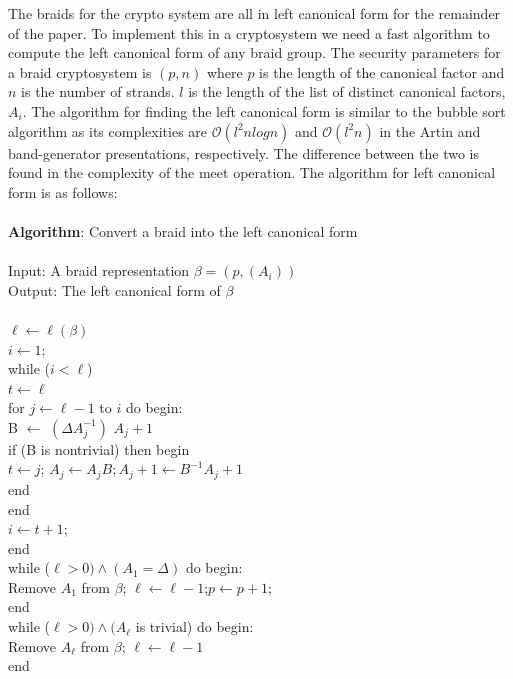 \documentclass{article}
\theoremstyle{definition}
\begin{document}
	The braids for the crypto system are all in left canonical form for the remainder of the paper. To implement this in a cryptosystem we need a fast algorithm to compute the left canonical form of any braid group. The security parameters for a braid cryptosystem is $(p,n)$ where $p$ is the length of the canonical factor and $n$ is the number of strands. $l$ is the length of the list of distinct canonical factors, $A_i$. The algorithm for finding the left canonical form is similar to the bubble sort algorithm as its complexities are $\mathcal{O}(l^2 n log{}n)$ and $\mathcal{O}(l^2 n)$ in the Artin and band-generator presentations, respectively. The difference between the two is found in the complexity of the meet operation. The algorithm for left canonical form is as follows:
	\\
	\\  \textbf{Algorithm}: Convert a braid into the left canonical form
	\\
	\\ \indent Input: A braid representation $\beta = (p, (A_i))$
	\\ \indent Output: The left canonical form of $\beta$
	\\
	\\ \indent $\ell \leftarrow \ell(\beta)$
	\\ \indent $i \leftarrow 1$;
	\\ \indent while ($i < \ell$)
	\\ \indent \indent $t \leftarrow \ell$
	\\ \indent  \indent for $ j \leftarrow \ell - 1$ to $i$ do begin:
	\\ \indent \indent \indent B $\leftarrow$ $(\Delta A_j^{-1})$ $A_j+1$
	\\ \indent \indent \indent if (B is nontrivial) then begin
	\\ \indent \indent \indent \indent $t \leftarrow j$; $A_j \leftarrow A_j B; A_j+1 \leftarrow B^{-1} A_j+1$
	\\\indent \indent \indent end
	\\\indent \indent end
	\\ \indent $i \leftarrow t + 1$;
	\\ \indent end
	\\ \indent while ($\ell > 0) \land (A_1 = \Delta)$ do begin:
	\\  \indent \indent Remove $A_1$ from $\beta$; $\ell \leftarrow \ell -1$;$p \leftarrow p +1$;
	\\ \indent end
	\\ \indent while ($\ell > 0) \land (A_\ell$ is trivial) do begin:
	\\ \indent \indent Remove $A_\ell$ from $\beta$; $\ell \leftarrow \ell -1$
	\\ \indent end
	
\end{document}
